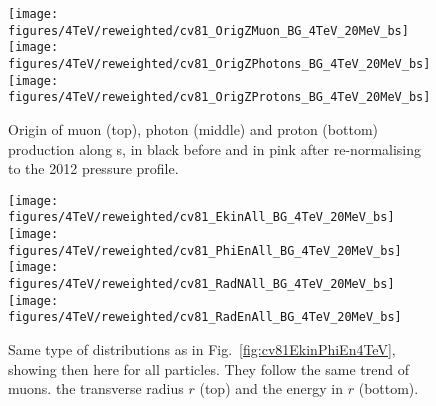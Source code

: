 \newpage



   


\begin{figure}
  
\begin{center}
  \texttt{[image: figures/4TeV/reweighted/cv81\_OrigZMuon\_BG\_4TeV\_20MeV\_bs]}
  \texttt{[image: figures/4TeV/reweighted/cv81\_OrigZPhotons\_BG\_4TeV\_20MeV\_bs]}
  \texttt{[image: figures/4TeV/reweighted/cv81\_OrigZProtons\_BG\_4TeV\_20MeV\_bs]}
\end{center}
\vspace{-0.6cm}
 \caption{Origin of muon (top), photon (middle) and proton (bottom) production along s, in black before and in pink after re-normalising to the 2012 pressure profile. 
  \label{fig:OrigZ4TeV2}}
\end{figure}

\begin{figure}
\begin{center}
   \texttt{[image: figures/4TeV/reweighted/cv81\_EkinAll\_BG\_4TeV\_20MeV\_bs]}
   \texttt{[image: figures/4TeV/reweighted/cv81\_PhiEnAll\_BG\_4TeV\_20MeV\_bs]}
  \texttt{[image: figures/4TeV/reweighted/cv81\_RadNAll\_BG\_4TeV\_20MeV\_bs]}
  \texttt{[image: figures/4TeV/reweighted/cv81\_RadEnAll\_BG\_4TeV\_20MeV\_bs]}
\end{center}
\vspace{-0.6cm}
 \caption{Same type of distributions as in Fig.~\ref{fig:cv81EkinPhiEn4TeV}, showing then here for all particles. They follow the same trend of muons. the transverse radius $r$ (top) and the energy in $r$ (bottom). 
  \label{fig:cv81EkinPhiEn4TeV2}} 
\end{figure}


